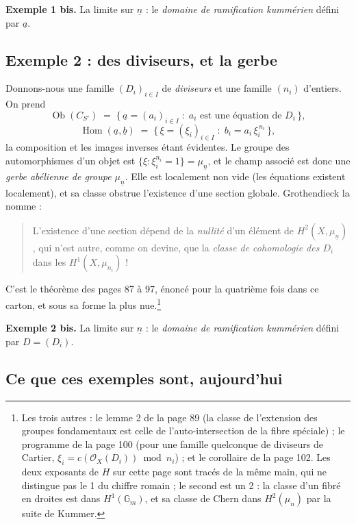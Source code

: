 \documentclass[11pt,a4paper]{article}
\begin{document}
\textbf{Exemple 1 bis.} La limite sur $\underline{n}$ : le \emph{domaine de
ramification kummérien} défini par $\underline{a}$.

\subsection*{Exemple 2 : des diviseurs, et la gerbe}

Donnons-nous une famille $(D_{i})_{i \in I}$ de \emph{diviseurs} et une famille
$(n_{i})$ d'entiers. On prend
\[
  \operatorname{Ob}(C_{S'}) \;=\; \bigl\{\, \underline{a} = (a_{i})_{i \in I}
  \;:\; a_{i} \text{ est une équation de } D_{i} \,\bigr\} ,
\]
\[
  \operatorname{Hom}(\underline{a}, \underline{b}) \;=\;
  \bigl\{\, \xi = (\xi_{i})_{i \in I} \;:\; b_{i} = a_{i}\,\xi_{i}^{\,n_{i}}
  \,\bigr\} ,
\]
la composition et les images inverses étant évidentes. Le groupe des
automorphismes d'un objet est $\{\xi : \xi_{i}^{n_{i}} = 1\} =
\mu_{\underline{n}}$, et le champ associé est donc une \emph{gerbe abélienne de
groupe $\mu_{\underline{n}}$}. Elle est localement non vide (les équations
existent localement), et sa classe obstrue l'existence d'une section globale.
Grothendieck la nomme :

\begin{quote}
L'existence d'une section dépend de la \emph{nullité} d'un élément de
$H^{2}(X, \mu_{\underline{n}})$, qui n'est autre, comme on devine, que la
\emph{classe de cohomologie des $D_{i}$} dans les $H^{1}(X, \mu_{n_{i}})$ !
\end{quote}

C'est le théorème des pages 87 à 97, énoncé pour la quatrième fois dans ce carton, et
sous sa forme la plus nue.\footnote{Les trois autres : le lemme 2 de la page 89
(la classe de l'extension des groupes fondamentaux est celle de
l'auto-intersection de la fibre spéciale) ; le programme de la page 100 (pour
une famille quelconque de diviseurs de Cartier, $\xi_{i} =
c(\mathcal{O}_{X}(D_{i})) \bmod n_{i}$) ; et le corollaire de la page 102. Les
deux exposants de $H$ sur cette page sont tracés de la même main, qui ne
distingue pas le 1 du chiffre romain ; le second est un 2 : la classe d'un
fibré en droites est dans $H^{1}(\mathbb{G}_{m})$, et sa classe de Chern dans
$H^{2}(\mu_{n})$ par la suite de Kummer.}

\textbf{Exemple 2 bis.} La limite sur $\underline{n}$ : le \emph{domaine de
ramification kummérien} défini par $D = (D_{i})$.

\subsection*{Ce que ces exemples sont, aujourd'hui}
\end{document}
